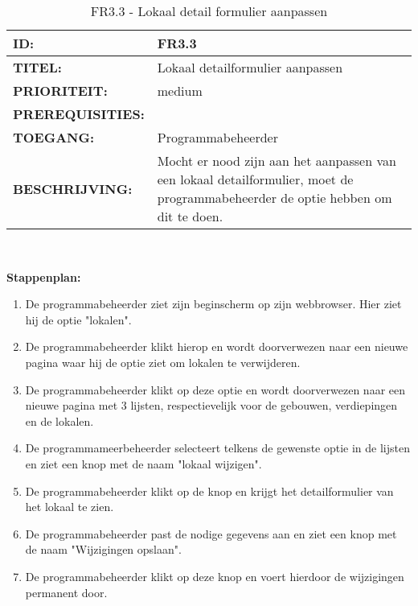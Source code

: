 \noindent\begin{table}[H]
            \begin{tabular}{l | p{10cm}}
                \textbf{ID:} & FR3.3 \\ \hline
                \textbf{TITEL:} & Lokaal detailformulier aanpassen\\ \hline
                \textbf{PRIORITEIT:} &  medium \\ \hline
                \textbf{PREREQUISITIES:} & \\ \hline
                \textbf{TOEGANG:} & Programmabeheerder \\ \hline
                \textbf{BESCHRIJVING:} & Mocht er nood zijn aan het aanpassen van een lokaal detailformulier, moet de programmabeheerder de optie hebben om dit te doen.\\ 
            \end{tabular}\\
            \caption{FR3.3 - Lokaal detail formulier aanpassen}
            \label{tab:FR3.3 - Lokaal detailformulier aanpassen}
        \end{table}
        
\textbf{Stappenplan:}
\begin{enumerate}
\item De programmabeheerder ziet zijn beginscherm op zijn webbrowser. Hier ziet hij de optie "lokalen".
\item De programmabeheerder klikt hierop en wordt doorverwezen naar een nieuwe pagina waar hij de optie ziet om lokalen te verwijderen.
\item De programmabeheerder klikt op deze optie en wordt doorverwezen naar een nieuwe pagina met 3 lijsten, respectievelijk voor de gebouwen, verdiepingen en de lokalen.
\item De programmameerbeheerder selecteert telkens de gewenste optie in de lijsten en ziet een knop met de naam "lokaal wijzigen".
\item De programmabeheerder klikt op de knop en krijgt het detailformulier van het lokaal te zien.
\item De programmabeheerder past de nodige gegevens aan en ziet een knop met de naam "Wijzigingen opslaan".
\item De programmabeheerder klikt op deze knop en voert hierdoor de wijzigingen permanent door.
\end{enumerate}
\clearpage